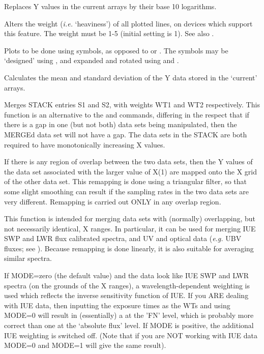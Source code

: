 \begin {description}
Replaces Y values in the current arrays by their base 10 logarithms.

Alters the weight ({\em i.e.} `heaviness') of all plotted lines, on
devices which support this feature. The weight must be 1-5 (initial
setting is 1). See also . 

Plots to be done using symbols, as opposed to   or .  The
symbols may be `designed' using ,  and expanded and rotated using
  and . 

Calculates the mean and standard deviation of the Y data stored in the
`current' arrays.

Merges STACK entries S1 and S2, with weights WT1 and WT2 respectively.
This function is an alternative to the   and   commands,
differing in the respect that if there is a gap in one (but not both)
data sets being manipulated, then the MERGEd data set will not have a
gap. The data sets in the STACK are both required to have monotonically
increasing X values.

If there is any region of overlap between the two data sets, then the Y
values of the data set associated with the larger value of X(1) are
mapped onto the X grid of the other data set. This remapping is done
using a triangular filter, so that some slight smoothing can result if
the sampling rates in the two data sets are very different. Remapping
is carried out ONLY in any overlap region.

This function is intended for merging data sets with (normally)
overlapping, but not necessarily identical, X ranges. In particular,
it can be used for merging IUE SWP and LWR flux calibrated spectra,
and UV and optical data ({\em e.g.} UBV fluxes; see ).  Because
remapping is done linearly, it is also suitable for averaging similar
spectra.

If MODE=zero (the default value) and the data look like IUE SWP and
LWR spectra (on the grounds of the X ranges), a wavelength-dependent
weighting is used which reflects the inverse sensitivity function of
IUE. If you ARE dealing with IUE data, then inputting the exposure
times as the WTs and using MODE=0 will result in (essentially) a  
at the 'FN' level, which is probably more correct than one at the
`absolute flux' level. If MODE is positive, the additional IUE
weighting is switched off. (Note that if you are NOT working with IUE
data MODE=0 and MODE=1 will give the same result).


\end{description}
